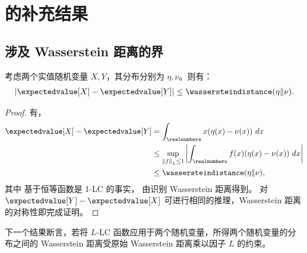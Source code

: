 
\section{\texorpdfstring{}{} 的补充结果}


\subsection{涉及 Wasserstein 距离的界}


\begin{prop}
\label{pp:expected_wass_dist}
    考虑两个实值随机变量 $X,Y$，其分布分别为 $\eta,\nu$。则有：
    \begin{align*}
        \left\vert \expectedvalue[X]-\expectedvalue[Y]  \right\vert\leq \wassersteindistance(\eta\Vert \nu).
    \end{align*}
\end{prop}
\begin{proof}
    有，
    \begin{align}
        \expectedvalue[X]-\expectedvalue[Y]
        &= \int_{\realnumbers} x(\eta(x)-\nu(x))~dx
        \nonumber\\
        &\leq\sup_{\left\Vert f\right\Vert_L\leq 1}\left\vert\int_{\realnumbers} f(x)(\eta(x)-\nu(x))~dx\right\vert
        \label{eq:x_lip}\\
        &\leq \wassersteindistance(\eta\Vert \nu),\label{eq:recognise_wass}
    \end{align}
    其中  基于恒等函数是 1-LC 的事实， 由识别 Wasserstein 距离得到。
    对 $\expectedvalue[Y]-\expectedvalue[X]$ 可进行相同的推理，Wasserstein 距离的对称性即完成证明。
\end{proof}

下一个结果断言，若将 $L$-LC 函数应用于两个随机变量，所得两个随机变量的分布之间的 Wasserstein 距离受原始 Wasserstein 距离乘以因子 $L$ 的约束。

